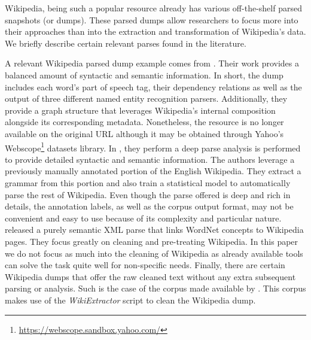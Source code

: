 Wikipedia, being such a popular resource  already has various off-the-shelf parsed snapshots (or dumps). These parsed dumps allow researchers to focus more into their approaches than into the extraction and transformation of Wikipedia's data.  We briefly describe certain relevant parses found in the literature.   
%



A relevant Wikipedia parsed dump example comes from \cite{ATSERIAS08}. Their work provides a balanced amount of syntactic and semantic information. In short, the dump includes each word's part of speech tag, their dependency relations as well as the output of three different named entity recognition parsers. Additionally, they provide a graph structure that leverages Wikipedia's internal composition alongside its corresponding metadata. Nonetheless, the resource is no longer available on the original URL although it may be obtained through Yahoo's Webscope\footnote{\url{https://webscope.sandbox.yahoo.com/}} datasets library.  In \cite{FLICKINGER10}, they perform a deep parse analysis is performed to provide detailed syntactic and semantic information. The authors leverage a previously manually annotated portion of the English Wikipedia. They extract a grammar from this portion and also train a statistical model  to automatically parse the rest of Wikipedia. Even though the parse offered is deep and rich in details, the annotation labels, as well as the corpus output format, may not be convenient and easy to use because of its complexity and particular nature. \cite{SchenkelSK07}  released a purely semantic XML parse that links WordNet concepts to Wikipedia pages. They focus greatly on cleaning and pre-treating Wikipedia. In this paper we do not focus as much into the cleaning of Wikipedia as already available tools can solve the task quite well for non-specific needs. 
Finally, there are certain Wikipedia dumps that offer the raw cleaned text without any extra subsequent parsing or analysis. Such is the case of the corpus made available by \cite{westbury2010}. This corpus makes  use of the \textit{WikiExtractor} script  \cite{Attardi2015} to clean the Wikipedia dump.
  
